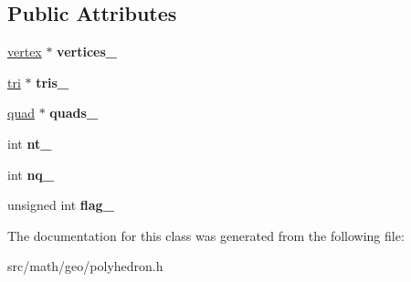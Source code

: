 \subsection*{Public Attributes}
\begin{DoxyCompactItemize}
\item 
\hypertarget{classmath_1_1geo_1_1polyhedron_a95b429bd2b0b049560fc008563663b17}{
\hyperlink{classmath_1_1geo_1_1vertex}{vertex} $\ast$ {\bfseries vertices\_\-}}
\label{classmath_1_1geo_1_1polyhedron_a95b429bd2b0b049560fc008563663b17}

\item 
\hypertarget{classmath_1_1geo_1_1polyhedron_a1f3a59fa6add8c59eea9deea460c3c96}{
\hyperlink{classmath_1_1geo_1_1tri}{tri} $\ast$ {\bfseries tris\_\-}}
\label{classmath_1_1geo_1_1polyhedron_a1f3a59fa6add8c59eea9deea460c3c96}

\item 
\hypertarget{classmath_1_1geo_1_1polyhedron_aece41abb7f5005d9ff6de2016aae790c}{
\hyperlink{classmath_1_1geo_1_1quad}{quad} $\ast$ {\bfseries quads\_\-}}
\label{classmath_1_1geo_1_1polyhedron_aece41abb7f5005d9ff6de2016aae790c}

\item 
\hypertarget{classmath_1_1geo_1_1polyhedron_ab8bbfdd91290c53d8f8e0c55c3f11fdd}{
int {\bfseries nt\_\-}}
\label{classmath_1_1geo_1_1polyhedron_ab8bbfdd91290c53d8f8e0c55c3f11fdd}

\item 
\hypertarget{classmath_1_1geo_1_1polyhedron_ac5bbb1b818226c30b4f8ea39006efa57}{
int {\bfseries nq\_\-}}
\label{classmath_1_1geo_1_1polyhedron_ac5bbb1b818226c30b4f8ea39006efa57}

\item 
\hypertarget{classmath_1_1geo_1_1polyhedron_a962cdc8309c56bd40a34c3af223d6fd3}{
unsigned int {\bfseries flag\_\-}}
\label{classmath_1_1geo_1_1polyhedron_a962cdc8309c56bd40a34c3af223d6fd3}

\end{DoxyCompactItemize}


The documentation for this class was generated from the following file:\begin{DoxyCompactItemize}
\item 
src/math/geo/polyhedron.h\end{DoxyCompactItemize}
